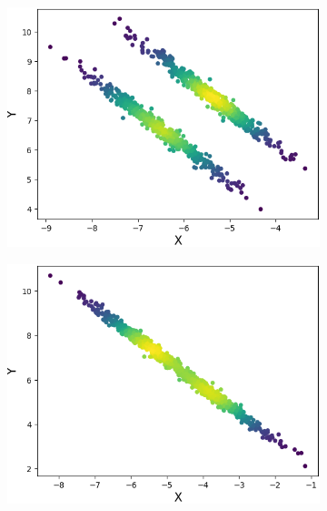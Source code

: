 \documentclass{llncs}
\begin{document}
\begin{figure}[ht]
\vspace*{-.4cm}
\centering
\begin{subfigure}[t]{0.25\textwidth}
\centering
\includegraphics[width=1\textwidth]{image/dgf_org_1.png}
\end{subfigure}
\begin{subfigure}[t]{0.25\textwidth}
\centering
\includegraphics[width=1\textwidth]{image/dgf_org_2.png}
\end{subfigure}
\begin{subfigure}[t]{0.25\textwidth}
\centering

\end{subfigure}
\end{figure}
\end{document}
